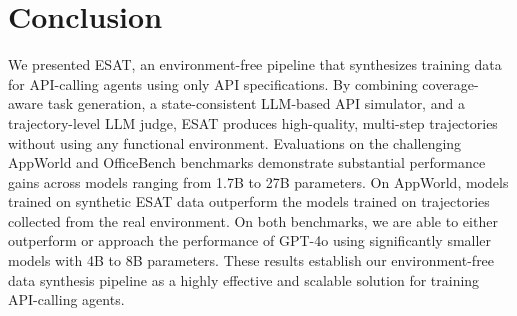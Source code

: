 \section{Conclusion}
We presented \textsc{ESAT}, an environment-free pipeline that synthesizes training data for API-calling agents using only API specifications. By combining coverage-aware task generation, a state-consistent LLM-based API simulator, and a trajectory-level LLM judge, \textsc{ESAT} produces high-quality, multi-step trajectories without using any functional environment. Evaluations on the challenging AppWorld and OfficeBench benchmarks demonstrate substantial performance gains across models ranging from 1.7B to 27B parameters. On AppWorld, models trained on synthetic \textsc{ESAT} data outperform the models trained on trajectories collected from the real environment. On both benchmarks, we are able to either outperform or approach the performance of GPT-4o using significantly smaller models with 4B to 8B parameters. These results establish our environment-free data synthesis pipeline as a highly effective and scalable solution for training API-calling agents.